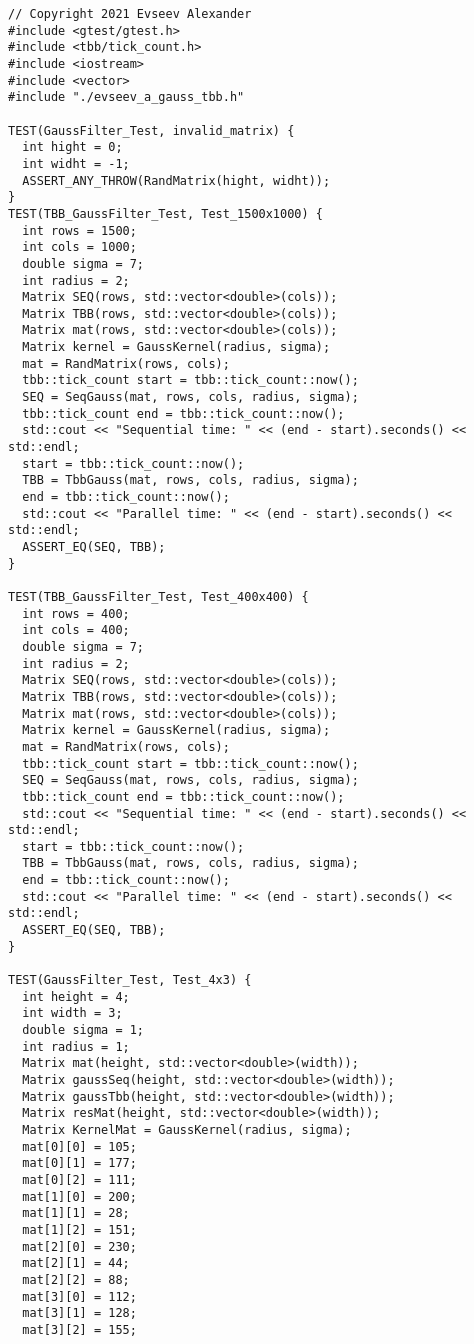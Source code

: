 \documentclass{report}
\begin{document}
\begin{lstlisting}
// Copyright 2021 Evseev Alexander
#include <gtest/gtest.h>
#include <tbb/tick_count.h>
#include <iostream>
#include <vector>
#include "./evseev_a_gauss_tbb.h"

TEST(GaussFilter_Test, invalid_matrix) {
  int hight = 0;
  int widht = -1;
  ASSERT_ANY_THROW(RandMatrix(hight, widht));
}
TEST(TBB_GaussFilter_Test, Test_1500x1000) {
  int rows = 1500;
  int cols = 1000;
  double sigma = 7;
  int radius = 2;
  Matrix SEQ(rows, std::vector<double>(cols));
  Matrix TBB(rows, std::vector<double>(cols));
  Matrix mat(rows, std::vector<double>(cols));
  Matrix kernel = GaussKernel(radius, sigma);
  mat = RandMatrix(rows, cols);
  tbb::tick_count start = tbb::tick_count::now();
  SEQ = SeqGauss(mat, rows, cols, radius, sigma);
  tbb::tick_count end = tbb::tick_count::now();
  std::cout << "Sequential time: " << (end - start).seconds() << std::endl;
  start = tbb::tick_count::now();
  TBB = TbbGauss(mat, rows, cols, radius, sigma);
  end = tbb::tick_count::now();
  std::cout << "Parallel time: " << (end - start).seconds() << std::endl;
  ASSERT_EQ(SEQ, TBB);
}

TEST(TBB_GaussFilter_Test, Test_400x400) {
  int rows = 400;
  int cols = 400;
  double sigma = 7;
  int radius = 2;
  Matrix SEQ(rows, std::vector<double>(cols));
  Matrix TBB(rows, std::vector<double>(cols));
  Matrix mat(rows, std::vector<double>(cols));
  Matrix kernel = GaussKernel(radius, sigma);
  mat = RandMatrix(rows, cols);
  tbb::tick_count start = tbb::tick_count::now();
  SEQ = SeqGauss(mat, rows, cols, radius, sigma);
  tbb::tick_count end = tbb::tick_count::now();
  std::cout << "Sequential time: " << (end - start).seconds() << std::endl;
  start = tbb::tick_count::now();
  TBB = TbbGauss(mat, rows, cols, radius, sigma);
  end = tbb::tick_count::now();
  std::cout << "Parallel time: " << (end - start).seconds() << std::endl;
  ASSERT_EQ(SEQ, TBB);
}

TEST(GaussFilter_Test, Test_4x3) {
  int height = 4;
  int width = 3;
  double sigma = 1;
  int radius = 1;
  Matrix mat(height, std::vector<double>(width));
  Matrix gaussSeq(height, std::vector<double>(width));
  Matrix gaussTbb(height, std::vector<double>(width));
  Matrix resMat(height, std::vector<double>(width));
  Matrix KernelMat = GaussKernel(radius, sigma);
  mat[0][0] = 105;
  mat[0][1] = 177;
  mat[0][2] = 111;
  mat[1][0] = 200;
  mat[1][1] = 28;
  mat[1][2] = 151;
  mat[2][0] = 230;
  mat[2][1] = 44;
  mat[2][2] = 88;
  mat[3][0] = 112;
  mat[3][1] = 128;
  mat[3][2] = 155;


\end{lstlisting}
\end{document}
